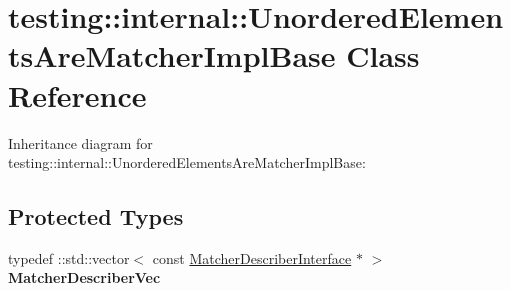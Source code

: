 \hypertarget{classtesting_1_1internal_1_1UnorderedElementsAreMatcherImplBase}{}\section{testing\+:\+:internal\+:\+:Unordered\+Elements\+Are\+Matcher\+Impl\+Base Class Reference}
\label{classtesting_1_1internal_1_1UnorderedElementsAreMatcherImplBase}


Inheritance diagram for testing\+:\+:internal\+:\+:Unordered\+Elements\+Are\+Matcher\+Impl\+Base\+:
\subsection*{Protected Types}
\begin{DoxyCompactItemize}
\item 
\mbox{\label{classtesting_1_1internal_1_1UnorderedElementsAreMatcherImplBase_a81ca7ce793d4b25ce2a7d3e28b48cd64}} 
typedef \+::std\+::vector$<$ const \hyperlink{classtesting_1_1MatcherDescriberInterface}{Matcher\+Describer\+Interface} $\ast$ $>$ {\bfseries Matcher\+Describer\+Vec}
\end{DoxyCompactItemize}
